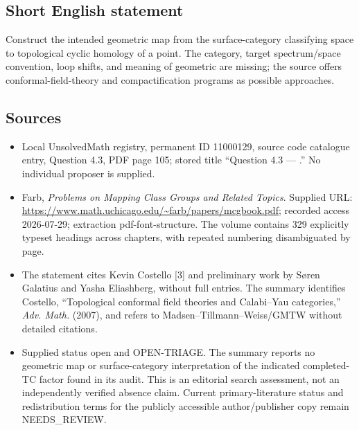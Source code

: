 \documentclass[11pt]{article}
\begin{document}
\subsection{Short English statement}
Construct the intended geometric map from the surface-category classifying space to topological cyclic homology of a point. The category, target spectrum/space convention, loop shifts, and meaning of geometric are missing; the source offers conformal-field-theory and compactification programs as possible approaches.
\subsection{Sources}
\begin{itemize}
\item Local UnsolvedMath registry, permanent ID 11000129, source code catalogue entry, Question 4.3, PDF page 105; stored title ``Question 4.3 --- .'' No individual proposer is supplied.
\item Farb, \emph{Problems on Mapping Class Groups and Related Topics}. Supplied URL: \url{https://www.math.uchicago.edu/~farb/papers/mcgbook.pdf}; recorded access 2026-07-29; extraction pdf-font-structure. The volume contains 329 explicitly typeset headings across chapters, with repeated numbering disambiguated by page.
\item The statement cites Kevin Costello [3] and preliminary work by S\o ren Galatius and Yasha Eliashberg, without full entries. The summary identifies Costello, ``Topological conformal field theories and Calabi--Yau categories,'' \emph{Adv. Math.} (2007), and refers to Madsen--Tillmann--Weiss/GMTW without detailed citations.
\item Supplied status open and OPEN-TRIAGE. The summary reports no geometric map or surface-category interpretation of the indicated completed-TC factor found in its audit. This is an editorial search assessment, not an independently verified absence claim. Current primary-literature status and redistribution terms for the publicly accessible author/publisher copy remain NEEDS\_REVIEW.
\end{itemize}
\end{document}
